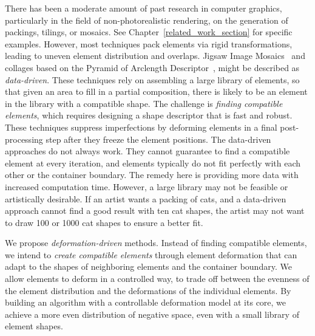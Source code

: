 

There has been a moderate amount of past research in computer
graphics, particularly in the field of non-photorealistic rendering,
on the generation of packings, tilings, or mosaics.  
See Chapter~\ref{related_work_section} for specific examples.  
However,  most techniques pack elements via rigid transformations, leading to
uneven element distribution and overlaps.  
Jigsaw Image Mosaics~\cite{Kim2002} and collages based on the Pyramid of Arclength
Descriptor~\cite{Kwan2016}, might be described as \textit{data-driven}.
These techniques rely on assembling a large library of elements, so that given an
area to fill in a partial composition, there is likely to be an
element in the library with a compatible shape.  The challenge is 
\textit{finding compatible elements}, 
which requires designing a shape descriptor that is fast and robust.
These techniques suppress imperfections by deforming
elements in a final post-processing step after they freeze the element positions.
The data-driven approaches do not always work.
They cannot guarantee to find a compatible element
at every iteration, and
elements typically do not fit perfectly with each other 
or the container boundary.
The remedy here is providing more data with increased computation time.
However, a large library may not be feasible or artistically desirable.
If an artist wants a packing of cats, and a data-driven approach 
cannot find a good result with ten cat shapes, 
the artist may not want to draw 100 or 1000 cat shapes to ensure a better fit.


We propose \textit{deformation-driven} methods.
Instead of finding compatible elements,
we intend to \textit{create compatible elements} through element deformation
that can adapt to the shapes of neighboring elements and the container boundary.
We allow elements to deform in a controlled way,
to trade off between the evenness of the element distribution and 
the deformations of the individual elements.
By building an algorithm with a controllable deformation model at its core, we achieve a
more even distribution of negative space, even with a small library of element shapes.

